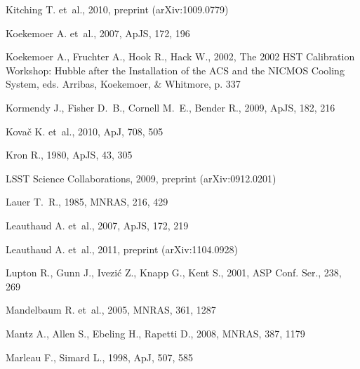 \documentclass[twocolumn,useAMS,usenatbib]{mn2e}
\begin{document}
\begin{thebibliography}{}
 {Kitching} T. et~al., 2010, preprint (arXiv:1009.0779)

 {Koekemoer} A. et~al., 2007, ApJS, 172, 196

 {Koekemoer} A., {Fruchter} A., {Hook} R., {Hack} W., 2002, {The 2002 HST Calibration Workshop: Hubble after the Installation of the ACS and the NICMOS Cooling System}, eds. Arribas, Koekemoer, \& Whitmore, p. 337

 {Kormendy} J., {Fisher} D.~B., {Cornell} M.~E., {Bender} R., 2009,
 ApJS, 182, 216

 {Kova{\v c}} K. et~al., 2010, ApJ, 708, 505

 {Kron} R., 1980, ApJS, 43, 305

 {LSST Science Collaborations}, 2009, preprint (arXiv:0912.0201)

{Lauer} T.~R., 1985, MNRAS, 216, 429

 {Leauthaud} A. et~al., 2007, ApJS, 172, 219

 {Leauthaud} A. et~al., 2011, preprint (arXiv:1104.0928)

 {Lupton} R., {Gunn} J., {Ivezi{\'c}} Z., {Knapp} G., {Kent} S., 2001, ASP Conf. Ser., 238, 269

 {Mandelbaum} R. et~al., 2005, MNRAS, 361, 1287

 {Mantz} A., {Allen} S., {Ebeling} H., {Rapetti} D., 2008, MNRAS, 387, 1179

 {Marleau} F., {Simard} L., 1998, ApJ, 507, 585


\end{thebibliography}
\end{document}
